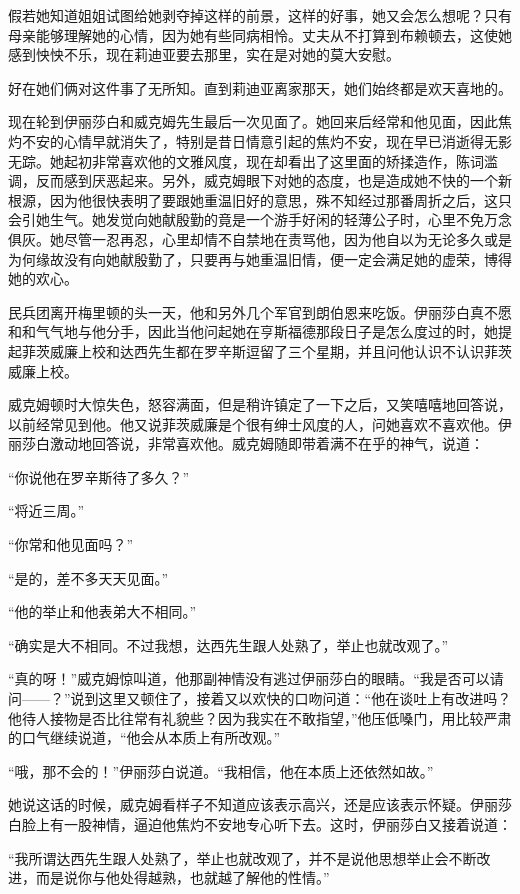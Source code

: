 \par 假若她知道姐姐试图给她剥夺掉这样的前景，这样的好事，她又会怎么想呢？只有母亲能够理解她的心情，因为她有些同病相怜。丈夫从不打算到布赖顿去，这使她感到怏怏不乐，现在莉迪亚要去那里，实在是对她的莫大安慰。
\par 好在她们俩对这件事了无所知。直到莉迪亚离家那天，她们始终都是欢天喜地的。
\par 现在轮到伊丽莎白和威克姆先生最后一次见面了。她回来后经常和他见面，因此焦灼不安的心情早就消失了，特别是昔日情意引起的焦灼不安，现在早已消逝得无影无踪。她起初非常喜欢他的文雅风度，现在却看出了这里面的矫揉造作，陈词滥调，反而感到厌恶起来。另外，威克姆眼下对她的态度，也是造成她不快的一个新根源，因为他很快表明了要跟她重温旧好的意思，殊不知经过那番周折之后，这只会引她生气。她发觉向她献殷勤的竟是一个游手好闲的轻薄公子时，心里不免万念俱灰。她尽管一忍再忍，心里却情不自禁地在责骂他，因为他自以为无论多久或是为何缘故没有向她献殷勤了，只要再与她重温旧情，便一定会满足她的虚荣，博得她的欢心。
\par 民兵团离开梅里顿的头一天，他和另外几个军官到朗伯恩来吃饭。伊丽莎白真不愿和和气气地与他分手，因此当他问起她在亨斯福德那段日子是怎么度过的时，她提起菲茨威廉上校和达西先生都在罗辛斯逗留了三个星期，并且问他认识不认识菲茨威廉上校。
\par 威克姆顿时大惊失色，怒容满面，但是稍许镇定了一下之后，又笑嘻嘻地回答说，以前经常见到他。他又说菲茨威廉是个很有绅士风度的人，问她喜欢不喜欢他。伊丽莎白激动地回答说，非常喜欢他。威克姆随即带着满不在乎的神气，说道：
\par “你说他在罗辛斯待了多久？”
\par “将近三周。”
\par “你常和他见面吗？”
\par “是的，差不多天天见面。”
\par “他的举止和他表弟大不相同。”
\par “确实是大不相同。不过我想，达西先生跟人处熟了，举止也就改观了。”
\par “真的呀！”威克姆惊叫道，他那副神情没有逃过伊丽莎白的眼睛。“我是否可以请问——？”说到这里又顿住了，接着又以欢快的口吻问道：“他在谈吐上有改进吗？他待人接物是否比往常有礼貌些？因为我实在不敢指望，”他压低嗓门，用比较严肃的口气继续说道，“他会从本质上有所改观。”
\par “哦，那不会的！”伊丽莎白说道。“我相信，他在本质上还依然如故。”
\par 她说这话的时候，威克姆看样子不知道应该表示高兴，还是应该表示怀疑。伊丽莎白脸上有一股神情，逼迫他焦灼不安地专心听下去。这时，伊丽莎白又接着说道：
\par “我所谓达西先生跟人处熟了，举止也就改观了，并不是说他思想举止会不断改进，而是说你与他处得越熟，也就越了解他的性情。”
